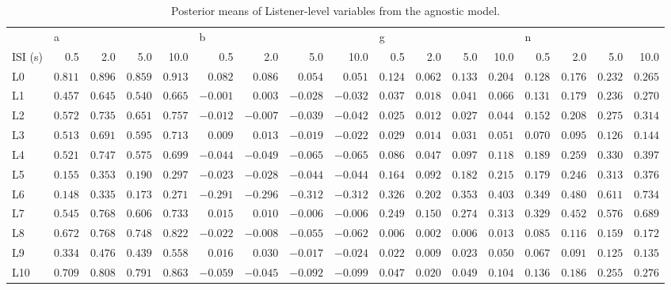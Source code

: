 \begin{table} \centering \caption{Posterior means of Listener-level variables from the agnostic model.} \label{vars} \begin{tabular}{lrrrrrrrrrrrrrrrr} \toprule {} & \multicolumn{4}{l}{a} & \multicolumn{4}{l}{b} & \multicolumn{4}{l}{g} & \multicolumn{4}{l}{n} \\ ISI (s) & 0.5 & 2.0 & 5.0 & 10.0 & 0.5 & 2.0 & 5.0 & 10.0 & 0.5 & 2.0 & 5.0 & 10.0 & 0.5 & 2.0 & 5.0 & 10.0 \\ \midrule L0 & $0.811$ & $0.896$ & $0.859$ & $0.913$ & $0.082$ & $0.086$ & $0.054$ & $0.051$ & $0.124$ & $0.062$ & $0.133$ & $0.204$ & $0.128$ & $0.176$ & $0.232$ & $0.265$ \\ L1 & $0.457$ & $0.645$ & $0.540$ & $0.665$ & $-0.001$ & $0.003$ & $-0.028$ & $-0.032$ & $0.037$ & $0.018$ & $0.041$ & $0.066$ & $0.131$ & $0.179$ & $0.236$ & $0.270$ \\ L2 & $0.572$ & $0.735$ & $0.651$ & $0.757$ & $-0.012$ & $-0.007$ & $-0.039$ & $-0.042$ & $0.025$ & $0.012$ & $0.027$ & $0.044$ & $0.152$ & $0.208$ & $0.275$ & $0.314$ \\ L3 & $0.513$ & $0.691$ & $0.595$ & $0.713$ & $0.009$ & $0.013$ & $-0.019$ & $-0.022$ & $0.029$ & $0.014$ & $0.031$ & $0.051$ & $0.070$ & $0.095$ & $0.126$ & $0.144$ \\ L4 & $0.521$ & $0.747$ & $0.575$ & $0.699$ & $-0.044$ & $-0.049$ & $-0.065$ & $-0.065$ & $0.086$ & $0.047$ & $0.097$ & $0.118$ & $0.189$ & $0.259$ & $0.330$ & $0.397$ \\ L5 & $0.155$ & $0.353$ & $0.190$ & $0.297$ & $-0.023$ & $-0.028$ & $-0.044$ & $-0.044$ & $0.164$ & $0.092$ & $0.182$ & $0.215$ & $0.179$ & $0.246$ & $0.313$ & $0.376$ \\ L6 & $0.148$ & $0.335$ & $0.173$ & $0.271$ & $-0.291$ & $-0.296$ & $-0.312$ & $-0.312$ & $0.326$ & $0.202$ & $0.353$ & $0.403$ & $0.349$ & $0.480$ & $0.611$ & $0.734$ \\ L7 & $0.545$ & $0.768$ & $0.606$ & $0.733$ & $0.015$ & $0.010$ & $-0.006$ & $-0.006$ & $0.249$ & $0.150$ & $0.274$ & $0.313$ & $0.329$ & $0.452$ & $0.576$ & $0.689$ \\ L8 & $0.672$ & $0.768$ & $0.748$ & $0.822$ & $-0.022$ & $-0.008$ & $-0.055$ & $-0.062$ & $0.006$ & $0.002$ & $0.006$ & $0.013$ & $0.085$ & $0.116$ & $0.159$ & $0.172$ \\ L9 & $0.334$ & $0.476$ & $0.439$ & $0.558$ & $0.016$ & $0.030$ & $-0.017$ & $-0.024$ & $0.022$ & $0.009$ & $0.023$ & $0.050$ & $0.067$ & $0.091$ & $0.125$ & $0.135$ \\ L10 & $0.709$ & $0.808$ & $0.791$ & $0.863$ & $-0.059$ & $-0.045$ & $-0.092$ & $-0.099$ & $0.047$ & $0.020$ & $0.049$ & $0.104$ & $0.136$ & $0.186$ & $0.255$ & $0.276$ \\ \bottomrule \end{tabular} \end{table}